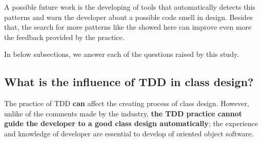\documentclass[conference]{IEEEtran}
\begin{document}

A possible future work is the developing of tools that automatically detects this patterns
and warn the developer about a possible code smell in design. Besides that,
the search for more patterns like the showed here can improve even more the feedback
provided by the practice.


In below subsections, we answer each of the questions raised by this study.


\subsection{What is the influence of TDD in class design?}

The practice of TDD \textbf{can} affect the creating process of class design. However,
unlike of the comments made by the industry, \textbf{the TDD practice cannot guide the
developer to a good class design automatically}; the experience and knowledge of
developer are essential to develop of oriented object software.

\end{document}
